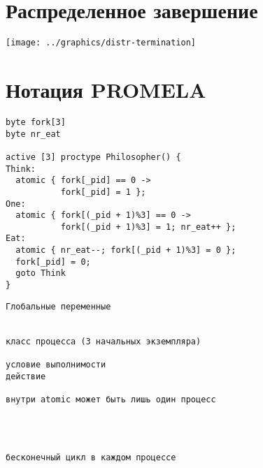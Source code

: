 \documentclass[12pt]{article}
\begin{document}
\section{Распределенное завершение}
\label{sec:distributed-termination}

\begin{center}
  \texttt{[image: ../graphics/distr-termination]}
\end{center}

\section{Нотация PROMELA}
\label{sec:promela-notation}


\begin{minipage}[t]{.53\textwidth}
\scriptsize
\begin{verbatim}
byte fork[3]
byte nr_eat

active [3] proctype Philosopher() { 
Think:
  atomic { fork[_pid] == 0 -> 
           fork[_pid] = 1 };
One:
  atomic { fork[(_pid + 1)%3] == 0 -> 
           fork[(_pid + 1)%3] = 1; nr_eat++ };
Eat:
  atomic { nr_eat--; fork[(_pid + 1)%3] = 0 };
  fork[_pid] = 0;
  goto Think
}
\end{verbatim}
\normalsize
\end{minipage}
%
\begin{minipage}[t]{.47\textwidth}
\scriptsize
\begin{verbatim}
Глобальные переменные


класс процесса (3 начальных экземпляра)

условие выполнимости
действие

внутри atomic может быть лишь один процесс




бесконечный цикл в каждом процессе

\end{verbatim}
\normalsize
\end{minipage}


\end{document}
